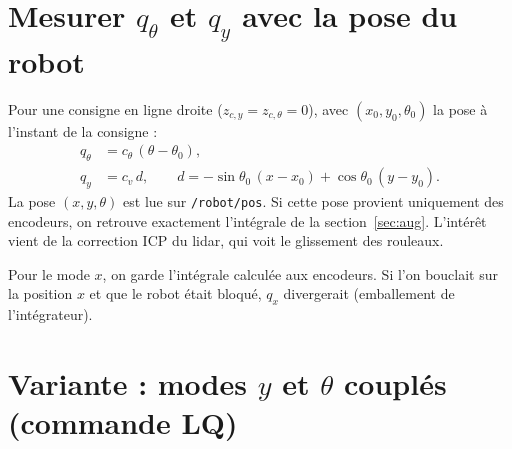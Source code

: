 \documentclass[11pt,a4paper]{article}
\begin{document}
\section{Mesurer $q_\theta$ et $q_y$ avec la pose du robot}\label{sec:pose}

Pour une consigne en ligne droite ($z_{c,y}=z_{c,\theta}=0$), avec $(x_0,y_0,\theta_0)$ la pose à l'instant de la consigne :
\begin{align}
q_\theta&=c_\theta\,(\theta-\theta_0),\\
q_y&=c_v\,d,\qquad d=-\sin\theta_0\,(x-x_0)+\cos\theta_0\,(y-y_0).
\end{align}
La pose $(x,y,\theta)$ est lue sur \texttt{/robot/pos}.
Si cette pose provient uniquement des encodeurs, on retrouve exactement l'intégrale de la section~\ref{sec:aug}.
L'intérêt vient de la correction ICP du lidar, qui voit le glissement des rouleaux.

Pour le mode $x$, on garde l'intégrale calculée aux encodeurs.
Si l'on bouclait sur la position $x$ et que le robot était bloqué, $q_x$ divergerait (emballement de l'intégrateur).

\section{Variante : modes $y$ et $\theta$ couplés (commande LQ)}
\end{document}
